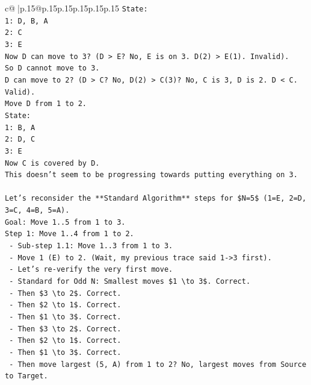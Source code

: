 \documentclass{article}
\begin{document}
{\begin{supertabular}{c@{$\;$}|p{.15\linewidth}@{}p{.15\linewidth}p{.15\linewidth}p{.15\linewidth}p{.15\linewidth}p{.15\linewidth}}
{{{\texttt{State:} \\
\texttt{1: D, B, A} \\
\texttt{2: C} \\
\texttt{3: E} \\
\texttt{Now D can move to 3? (D > E? No, E is on 3. D(2) > E(1). Invalid).} \\
\texttt{So D cannot move to 3.} \\
\texttt{D can move to 2? (D > C? No, D(2) > C(3)? No, C is 3, D is 2. D < C. Valid).} \\
\texttt{Move D from 1 to 2.} \\
\texttt{State:} \\
\texttt{1: B, A} \\
\texttt{2: D, C} \\
\texttt{3: E} \\
\texttt{Now C is covered by D.} \\
\texttt{This doesn't seem to be progressing towards putting everything on 3.} \\
\\ 
\texttt{Let's reconsider the **Standard Algorithm** steps for \$N=5\$ (1=E, 2=D, 3=C, 4=B, 5=A).} \\
\texttt{Goal: Move 1..5 from 1 to 3.} \\
\texttt{Step 1: Move 1..4 from 1 to 2.} \\
\texttt{   {-} Sub{-}step 1.1: Move 1..3 from 1 to 3.} \\
\texttt{     {-} Move 1 (E) to 2. (Wait, my previous trace said 1{-}>3 first).} \\
\texttt{     {-} Let's re{-}verify the very first move.} \\
\texttt{     {-} Standard for Odd N: Smallest moves \$1 \textbackslash{}to 3\$. Correct.} \\
\texttt{     {-} Then \$3 \textbackslash{}to 2\$. Correct.} \\
\texttt{     {-} Then \$2 \textbackslash{}to 1\$. Correct.} \\
\texttt{     {-} Then \$1 \textbackslash{}to 3\$. Correct.} \\
\texttt{     {-} Then \$3 \textbackslash{}to 2\$. Correct.} \\
\texttt{     {-} Then \$2 \textbackslash{}to 1\$. Correct.} \\
\texttt{     {-} Then \$1 \textbackslash{}to 3\$. Correct.} \\
\texttt{     {-} Then move largest (5, A) from 1 to 2? No, largest moves from Source to Target.} \\
}}}
\end{supertabular}}
\end{document}
